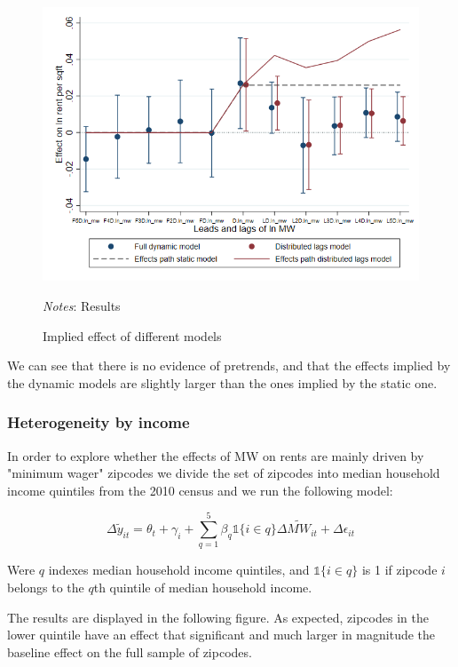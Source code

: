     \begin{figure}[h!] \centering
        \caption{Implied effect of different models}
        \label{fig:fd_models}
        \includegraphics[width=0.75\linewidth]{analysis/first_differences/output/fd_models.png}
        \begin{minipage}{.95\textwidth} \footnotesize
			\vspace{2mm} 
			\textit{Notes}: Results 
		\end{minipage}
    \end{figure}
    
    We can see that there is no evidence of pretrends, and that the effects implied by the dynamic models are slightly larger than the ones implied by the static one.  
    
    
    \subsubsection{Heterogeneity by income}
    
    In order to explore whether the effects of MW on rents are mainly driven by "minimum wager" zipcodes we divide the set of zipcodes into median household income quintiles from the 2010 census and we run the following model:
    
    \begin{equation}\label{eq:diff_main}
            \Delta \tilde{y}_{it} = \theta_t + \gamma_i + \sum_{q=1}^5 \beta_q \mathds{1}\{i\in q\} \Delta \tilde{MW}_{it}+ \Delta \epsilon_{it}
    \end{equation}
    
    Were $q$ indexes median household income quintiles, and $\mathds{1}\{i\in q\}$ is 1 if zipcode $i$ belongs to the $q$th quintile of median household income. 
    
    The results are displayed in the following figure. As expected, zipcodes in the lower quintile have an effect that significant and much larger in magnitude the baseline effect on the full sample of zipcodes.
    
